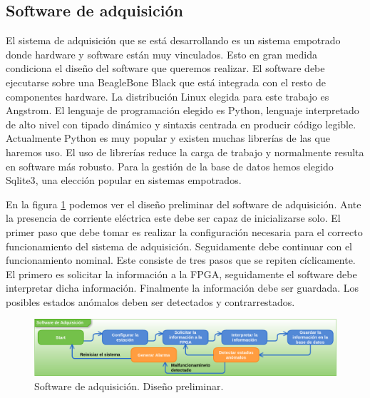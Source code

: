 	\subsection{Software de adquisición}
		El sistema de adquisición que se está desarrollando es un sistema empotrado donde hardware y software están muy vinculados. Esto en
		gran medida condiciona el diseño del software que queremos realizar. El software debe ejecutarse sobre una BeagleBone
		Black\cite{Beagle} que está integrada con el resto de componentes hardware. La distribución Linux elegida para este trabajo es
		Angstrom. El lenguaje de programación elegido es Python\cite{Python}, lenguaje interpretado de alto nivel con tipado dinámico y
		sintaxis centrada en producir código legible. Actualmente Python es muy popular y existen muchas librerías de las que haremos uso. El
		uso de librerías reduce la carga de trabajo y normalmente resulta en software más robusto. Para la gestión de la base de datos hemos
		elegido Sqlite3\cite{Sqlite}, una elección popular en sistemas empotrados. 
		\par
		En la figura \ref{fig:soft_control_preliminar} podemos ver el diseño preliminar del software de adquisición. Ante la presencia de
		corriente eléctrica este debe ser capaz de inicializarse solo. El primer paso que debe tomar es realizar la configuración necesaria
		para el correcto funcionamiento del sistema de adquisición. Seguidamente debe continuar con el funcionamiento nominal. Este consiste
		de tres pasos que se repiten cíclicamente. El primero es solicitar la información a la FPGA, seguidamente el software debe interpretar
		dicha información. Finalmente la información debe ser guardada. Los posibles estados anómalos deben ser detectados y contrarrestados. 
		\begin{figure}[h]
			\centering
			\includegraphics[keepaspectratio, width=1\textwidth]{./img/soft_control_preliminar.png}
			\caption{Software de adquisición. Diseño preliminar.}
			\label{fig:soft_control_preliminar}
		\end{figure}
